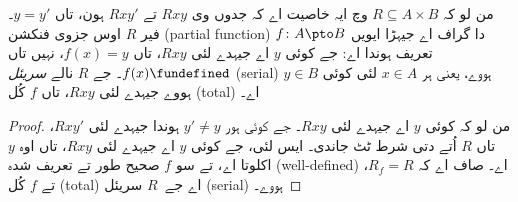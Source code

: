 \documentclass[../../../include/open-logic-section]{subfiles}
\begin{document}
\begin{prop}
من لو کہ $R \subseteq A \times B$ وچ ایہ خاصیت اے کہ جدوں وی $Rxy$
تے $Rxy'$ ہون، تاں $y = y'$۔ فیر $R$ اوس جزوی فنکشن (partial
function) $f\colon A \pto B$ دا گراف اے جیہڑا ایویں تعریف ہوندا اے:
جے کوئی $y$ اے جیہدے لئی $Rxy$، تاں $f(x) = y$، نہیں تاں
$f(x) \fundefined$۔ جے $R$ نالے \emph{سریئل} (serial) ہووے، یعنی ہر
$x \in A$ لئی کوئی $y \in B$ ہووے جیہدے لئی $Rxy$، تاں $f$ کُل
(total) اے۔
\end{prop}

\begin{proof}
من لو کہ کوئی $y$ اے جیہدے لئی $Rxy$۔ جے کوئی ہور $y' \neq y$
ہوندا جیہدے لئی $Rxy'$، تاں $R$ اُتے دتی شرط ٹٹ جاندی۔ ایس لئی، جے
کوئی $y$ اے جیہدے لئی $Rxy$، تاں اوہ $y$ اکلوتا اے، تے سو $f$
صحیح طور تے تعریف شدہ (well-defined) اے۔ صاف اے کہ $R_f = R$، تے
$f$ کُل (total) اے جے~$R$ سریئل (serial) ہووے۔
\end{proof}
\end{document}
